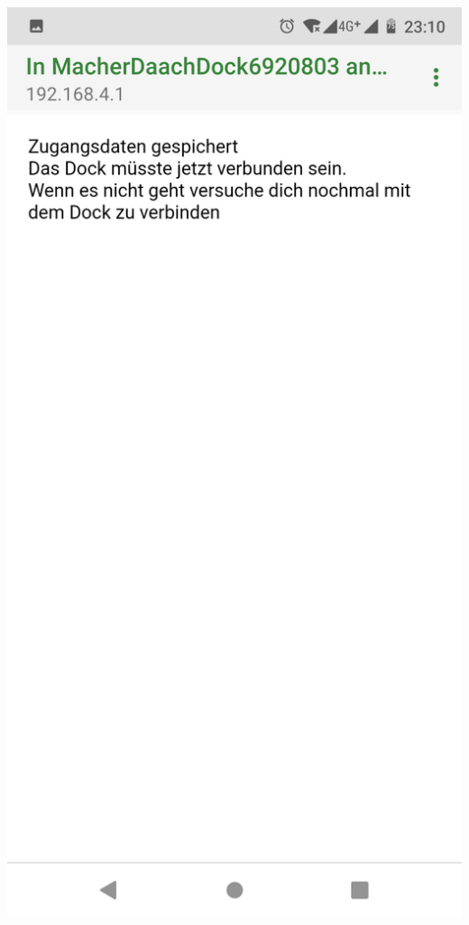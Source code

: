 \documentclass{article}
\begin{document}
\vspace{0.5cm}

\begin{minipage}[b]{0.5\textwidth}
	\includegraphics[width=\textwidth]{Bilder2019/Screenshot_20190918-231047_CaptivePortalLogin.png}
\end{minipage}
\end{document}
